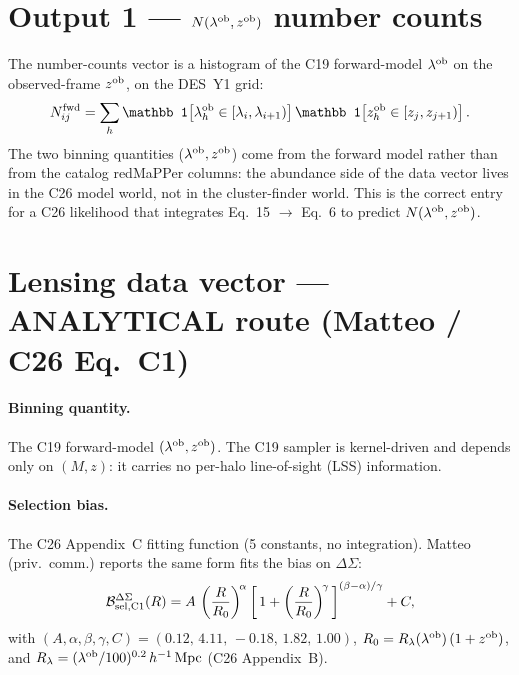 \documentclass[a4paper, 11pt]{article}
\newcommand{\lob}{\lambda^{\rm ob}}
\newcommand{\zob}{z^{\rm ob}}
\newcommand{\hMpc}{h^{-1}\,\mathrm{Mpc}}
\newcommand{\Bcal}{\mathcal{B}}
\begin{document}
\section{Output 1 --- $N(\lob, \zob)$ number counts}
\label{sec:counts}

The number-counts vector is a histogram of the C19 forward-model $\lob$
on the observed-frame $\zob$, on the DES~Y1 grid:
\begin{equation*}
  N_{ij}^{\rm fwd}
  = \sum_{h} \mathbb 1\!\left[\lob_h \in [\lambda_i, \lambda_{i+1})\right]
    \mathbb 1\!\left[\zob_h \in [z_j, z_{j+1})\right].
\end{equation*}
The two binning quantities ($\lob, \zob$) come from the forward model
rather than from the catalog redMaPPer columns: the abundance side of the
data vector lives in the C26 model world, not in the cluster-finder world.
This is the correct entry for a C26 likelihood that integrates Eq.~15
$\to$ Eq.~6 to predict $N(\lob, \zob)$.

\section{Lensing data vector --- ANALYTICAL route (Matteo / C26 Eq.~C1)}
\label{sec:c1}

\paragraph{Binning quantity.} The C19 forward-model
$(\lob, \zob)$. The C19 sampler is kernel-driven and depends only on
$(M, z)$: it carries no per-halo line-of-sight (LSS) information.

\paragraph{Selection bias.} The C26 Appendix~C fitting function
(5 constants, no integration). Matteo (priv.\ comm.) reports the same form
fits the bias on $\Delta\Sigma$:
\begin{equation}
\label{eq:c1-form}
  \Bcal_{\rm sel,C1}^{\Delta\Sigma}(R)
  = A\,\left(\frac{R}{R_0}\right)^{\!\alpha}
    \left[\,1 + \left(\frac{R}{R_0}\right)^{\!\gamma}\,\right]^{(\beta - \alpha)/\gamma}
    + C,
\end{equation}
with $(A, \alpha, \beta, \gamma, C) = (0.12,\, 4.11,\, -0.18,\, 1.82,\, 1.00)$,
$R_0 = R_\lambda(\lob)\,(1+\zob)$, and
$R_\lambda = (\lob/100)^{0.2}\,\hMpc$ (C26 Appendix~B).
\end{document}
